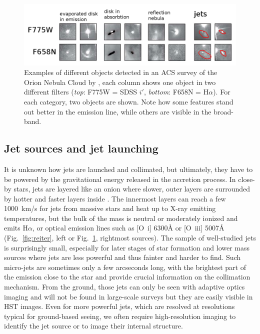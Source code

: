 \documentclass[12pt]{article}
\begin{document}
\begin{figure}
    \centering
    \includegraphics[width=\textwidth]{ONCACS.png}
    \caption{Examples of different objects detected in an ACS survey of the Orion Nebula Cloud by \citet{2008AJ....136.2136R}, each column shows one object in two different filters (\emph{top}: F775W = SDSS $i'$, \emph{bottom}: F658N = H$\alpha$). For each category, two objects are shown. Note how some features stand out better in the emission line, while others are visible in the broad-band.}
    \label{fig:ONCACS}
\end{figure}

\subsection{Jet sources and jet launching}
It is unknown how jets are launched and collimated, but ultimately, they have
to be powered by the gravitational energy released in the accretion process. In
close-by stars, jets are layered like an onion where slower, outer layers are
surrounded by hotter and faster layers inside \citep{1993ApJ...409..748G,2000ApJ...537L..49B}. The
innermost layers can reach a few 1000~km/s for jets from massive stars and heat
up to X-ray emitting temperatures, but the bulk of the mass is neutral or
moderately ionized and emits H$\alpha$, or optical emission lines such as
[O~{\sc i}] 6300\AA{} or [O~{\sc iii}] 5007\AA{} (Fig.~\ref{fig:reiter},
left or Fig.~\ref{fig:ONCACS}, rightmost sources). The sample of well-studied jets is surprisingly small, especially for
later stages of star formation and lower mass sources where jets are less
powerful and thus fainter and harder to find. Such micro-jets are sometimes
only a few arcseconds long, with the brightest part of the emission close to
the star and provide crucial information on the collimation mechanism. From the ground, those jets can only be seen with adaptive optics
imaging and will not be found in large-scale surveys but they are easily
visible in HST images. Even for more powerful jets, which are resolved at
resolutions typical for ground-based seeing, we often require high-resolution
imaging to identify the jet source or to image their internal structure.
\end{document}
